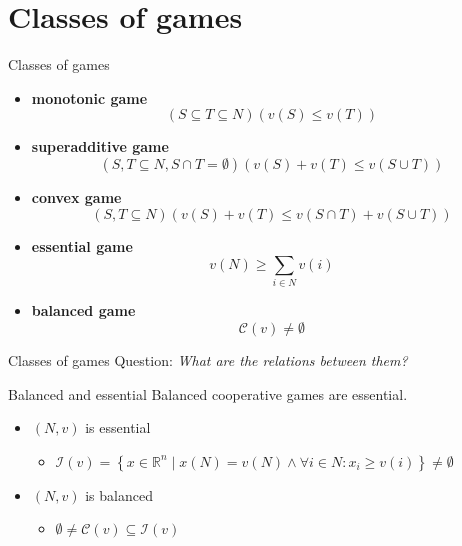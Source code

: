 \documentclass{beamer}
\newcommand{\R}{\mathbb{R}}
\begin{document}


\section{Classes of games}


\begin{frame}{Classes of games}
    \begin{itemize}
		\item \textbf{monotonic game} \[\left(S \subseteq T \subseteq N\right)\left(v(S) \leq v(T)\right)\]
		\item \textbf{superadditive game} \[\left(S,T \subseteq N, S \cap T = \emptyset\right)\left(v(S)+v(T) \leq v\left(S \cup T\right)\right)\]
		\item \textbf{convex game} \[\left(S,T \subseteq N\right)\left(v(S)+v(T) \leq v\left(S \cap T\right)+v\left(S \cup T\right)\right)\]
		\item \textbf{essential game} \[v(N) \geq \sum_{i \in N} v(i)\]
		\item \textbf{balanced game} \[\mathcal{C}(v) \neq \emptyset\]
	\end{itemize}
\end{frame}



\begin{frame}{Classes of games}
    Question: \textit{What are the relations between them?}
	\begin{block}{Balanced and essential}
		Balanced cooperative games are essential.
	\end{block}
	\begin{itemize}
		\item $(N,v)$ is essential
		\begin{itemize}
			\item $\mathcal{I}(v)=\left\{x \in \R^n \mid x(N)=v(N)\land \forall i \in N: x_i \geq v(i)\right\} \neq \emptyset$
		\end{itemize}
		\item $(N,v)$ is balanced
		\begin{itemize}
			\item $\emptyset \neq \mathcal{C}(v) \subseteq \mathcal{I}(v)$
		\end{itemize}
	\end{itemize}
\end{frame}
\end{document}

